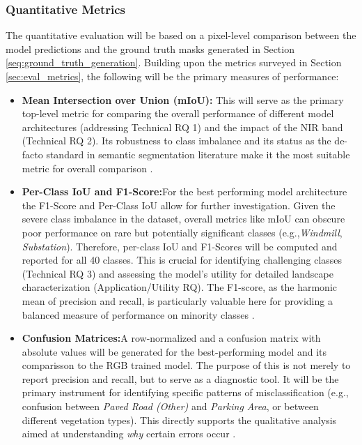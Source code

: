 \documentclass{report}
\begin{document}
\subsubsection{Quantitative Metrics}
The quantitative evaluation will be based on a pixel-level comparison between the model predictions and the ground truth masks generated in Section \ref{seq:ground_truth_generation}. Building upon the metrics surveyed in Section \ref{sec:eval_metrics}, the following will be the primary measures of performance:
\begin{itemize} 
    \item\textbf{Mean Intersection over Union (mIoU):} This will serve as the primary top-level metric for comparing the overall performance of different model architectures (addressing Technical RQ 1) and the impact of the NIR band (Technical RQ 2). Its robustness to class imbalance and its status as the de-facto standard in semantic segmentation literature make it the most suitable metric for overall comparison \parencite [p.~31.]{LeiEtAlDeeplearningimplementationimagesegmentationagriculturalapplicationscomprehensivereview2024}.
    \item\textbf{Per-Class IoU and F1-Score:}For the best performing model architecture the F1-Score and Per-Class IoU allow for further investigation. Given the severe class imbalance in the dataset, overall metrics like mIoU can obscure poor performance on rare but potentially significant classes (e.g.,\textit{Windmill}, \textit{Substation}). Therefore, per-class IoU and F1-Scores will be computed and reported for all 40 classes. This is crucial for identifying challenging classes (Technical RQ 3) and assessing the model's utility for detailed landscape characterization (Application/Utility RQ). The F1-score, as the harmonic mean of precision and recall, is particularly valuable here for providing a balanced measure of performance on minority classes \parencite [p.~9.]{SertelEtAlLandUseLandCoverMappingUsingDeepLearningBasedSegmentationApproachesVHRWorldview3Images2022}.
    \item\textbf{Confusion Matrices:}A row-normalized and a confusion matrix with absolute values will be generated for the best-performing model and its comparisson to the RGB trained model. The purpose of this is not merely to report precision and recall, but to serve as a diagnostic tool. It will be the primary instrument for identifying specific patterns of misclassification (e.g., confusion between \textit{Paved Road (Other)} and \textit{Parking Area}, or between different vegetation types). This directly supports the qualitative analysis aimed at understanding \textit{why} certain errors occur \parencite [p.~8f.]{SertelEtAlLandUseLandCoverMappingUsingDeepLearningBasedSegmentationApproachesVHRWorldview3Images2022}.
\end{itemize}
\end{document}
